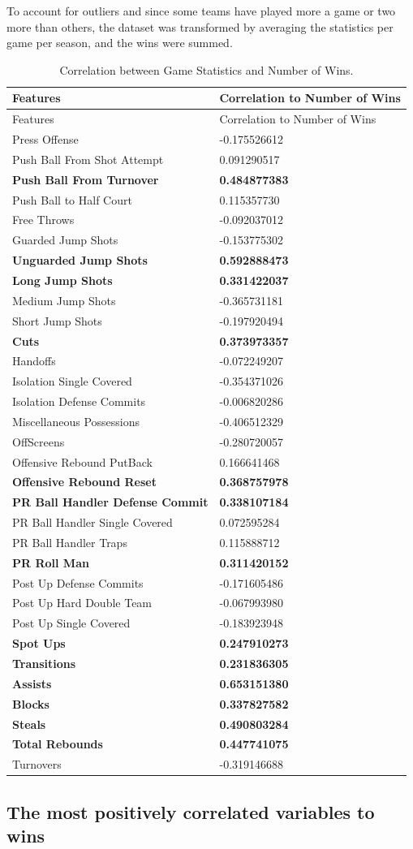 \documentclass[]{book}
\begin{document}
To account for outliers and since some teams have played more a game or two more than others, the dataset was transformed by averaging the statistics per game per season, and the wins were summed.

\begin{longtable}[]{@{}ll@{}}
\caption{\label{tab:corr-wins} Correlation between Game Statistics and Number of Wins.}\tabularnewline
\toprule
Features & Correlation to Number of Wins\tabularnewline
\midrule
\endfirsthead
\toprule
Features & Correlation to Number of Wins\tabularnewline
\midrule
\endhead
Press Offense & -0.175526612\tabularnewline
Push Ball From Shot Attempt & 0.091290517\tabularnewline
\textbf{Push Ball From Turnover} & \textbf{0.484877383}\tabularnewline
Push Ball to Half Court & 0.115357730\tabularnewline
Free Throws & -0.092037012\tabularnewline
Guarded Jump Shots & -0.153775302\tabularnewline
\textbf{Unguarded Jump Shots} & \textbf{0.592888473}\tabularnewline
\textbf{Long Jump Shots} & \textbf{0.331422037}\tabularnewline
Medium Jump Shots & -0.365731181\tabularnewline
Short Jump Shots & -0.197920494\tabularnewline
\textbf{Cuts} & \textbf{0.373973357}\tabularnewline
Handoffs & -0.072249207\tabularnewline
Isolation Single Covered & -0.354371026\tabularnewline
Isolation Defense Commits & -0.006820286\tabularnewline
Miscellaneous Possessions & -0.406512329\tabularnewline
OffScreens & -0.280720057\tabularnewline
Offensive Rebound PutBack & 0.166641468\tabularnewline
\textbf{Offensive Rebound Reset} & \textbf{0.368757978}\tabularnewline
\textbf{PR Ball Handler Defense Commit} & \textbf{0.338107184}\tabularnewline
PR Ball Handler Single Covered & 0.072595284\tabularnewline
PR Ball Handler Traps & 0.115888712\tabularnewline
\textbf{PR Roll Man} & \textbf{0.311420152}\tabularnewline
Post Up Defense Commits & -0.171605486\tabularnewline
Post Up Hard Double Team & -0.067993980\tabularnewline
Post Up Single Covered & -0.183923948\tabularnewline
\textbf{Spot Ups} & \textbf{0.247910273}\tabularnewline
\textbf{Transitions} & \textbf{0.231836305}\tabularnewline
\textbf{Assists} & \textbf{0.653151380}\tabularnewline
\textbf{Blocks} & \textbf{0.337827582}\tabularnewline
\textbf{Steals} & \textbf{0.490803284}\tabularnewline
\textbf{Total Rebounds} & \textbf{0.447741075}\tabularnewline
Turnovers & -0.319146688\tabularnewline
\bottomrule
\end{longtable}

\hypertarget{the-most-positively-correlated-variables-to-wins}{%
\subsection{The most positively correlated variables to wins}\label{the-most-positively-correlated-variables-to-wins}}
\end{document}
